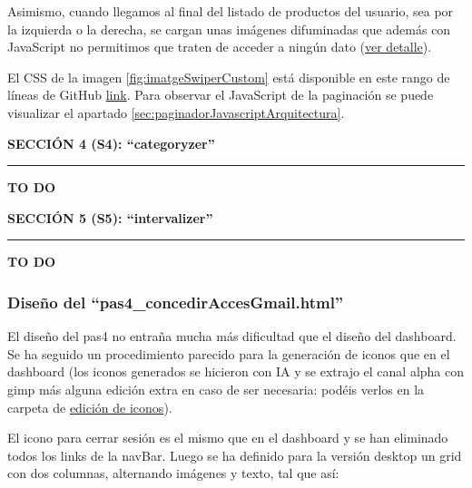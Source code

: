 \documentclass[a4paper,12pt]{report}
\begin{document}
	Asimismo, cuando llegamos al final del listado de productos del usuario, sea por la izquierda o la derecha, se cargan unas imágenes difuminadas que además con JavaScript no permitimos que traten de acceder a ningún dato (\href{https://github.com/blackcub3s/mercApp/blob/main/APP%20WEB/__frontend__produccio__/app/img/dashboard/paginadorEsqDifuminat.png}{ver detalle}).
	
	El CSS de la imagen \ref{fig:imatgeSwiperCustom} está disponible en este rango de líneas de GitHub \href{https://github.com/blackcub3s/mercApp/blob/4ddc34194763af7a246ffabb14146ad9b4b2c5db/APP%20WEB/__frontend__produccio__/app/css/dashboard/estils.css#L155}{link}. Para observar el JavaScript de la paginación se puede visualizar el apartado \ref{sec:paginadorJavascriptArquitectura}.
	
	
	
	
	\noindent \textbf{SECCIÓN 4 (S4): ``categoryzer''}
	\hrule
	\vspace{.5em}
	
	\textbf{TO DO}
	
	
	\noindent \textbf{SECCIÓN 5 (S5): ``intervalizer''}
	\hrule
	\vspace{.5em}
	
	\textbf{TO DO}
	
	\subsubsection{Diseño del ``pas4\_concedirAccesGmail.html''}
	\label{sec:dissenyHtmlCSSpas4}
	
	El diseño del pas4 no entraña mucha más dificultad que el diseño del dashboard. Se ha seguido un procedimiento parecido para la generación de iconos que en el dashboard (los iconos generados se hicieron con IA y se extrajo el canal alpha con gimp más alguna edición extra en caso de ser necesaria: podéis verlos en la carpeta de \href{https://github.com/blackcub3s/mercApp/tree/main/creacioIconos/iconosPas4}{edición de iconos}).
	
	El icono para cerrar sesión es el mismo que en el dashboard y se han eliminado todos los links de la navBar. Luego se ha definido para la versión desktop un grid con dos columnas, alternando imágenes y texto, tal que así:
	
\end{document}
